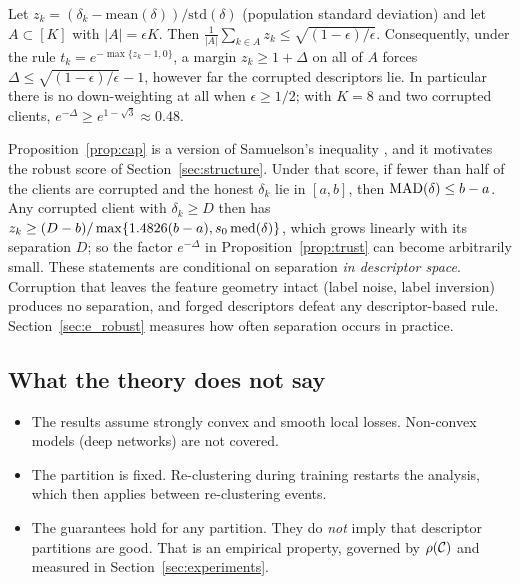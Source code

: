 \begin{proposition}\label{prop:cap}
Let $z_k=(\delta_k-\mathrm{mean}(\delta))/\mathrm{std}(\delta)$ (population standard deviation)
and let $A\subset[K]$ with $|A|=\epsilon K$. Then
$\frac1{|A|}\sum_{k\in A}z_k\le\sqrt{(1-\epsilon)/\epsilon}$. Consequently, under the rule
$t_k=e^{-\max\{z_k-1,0\}}$, a margin $z_k\ge1+\Delta$ on all of $A$ forces
$\Delta\le\sqrt{(1-\epsilon)/\epsilon}-1$, however far the corrupted descriptors lie.
In particular there is no down-weighting at all when $\epsilon\ge1/2$; with $K=8$ and two
corrupted clients, $e^{-\Delta}\ge e^{1-\sqrt3}\approx0.48$.
\end{proposition}

Proposition~\ref{prop:cap} is a version of Samuelson's inequality
\citep{samuelson1968deviant}, and it motivates the robust score of
Section~\ref{sec:structure}. Under that score, if fewer than half of the clients are
corrupted and the honest $\delta_k$ lie in $[a,b]$, then $\operatorname{MAD}(\delta)\le b-a$. Any corrupted
client with $\delta_k\ge D$ then has $z_k\ge(D-b)/\max\{1.4826(b-a),s_0\operatorname{med}(\delta)\}$, which
grows linearly with its separation $D$; so the factor $e^{-\Delta}$ in
Proposition~\ref{prop:trust} can become arbitrarily small. These statements are conditional
on separation \emph{in descriptor space}. Corruption that leaves the feature geometry intact
(label noise, label inversion) produces no separation, and forged descriptors defeat any
descriptor-based rule. Section~\ref{sec:e_robust} measures how often separation occurs in
practice.

\subsection{What the theory does not say}
\label{sec:theory_scope}
\begin{itemize}[leftmargin=1.2em,itemsep=2pt]
  \item The results assume strongly convex and smooth local losses. Non-convex models (deep
    networks) are not covered.
  \item The partition is fixed. Re-clustering during training restarts the analysis, which
    then applies between re-clustering events.
  \item The guarantees hold for any partition. They do \emph{not} imply that descriptor
    partitions are good. That is an empirical property, governed by $\rho(\mathcal{C})$ and
    measured in Section~\ref{sec:experiments}.
\end{itemize}

